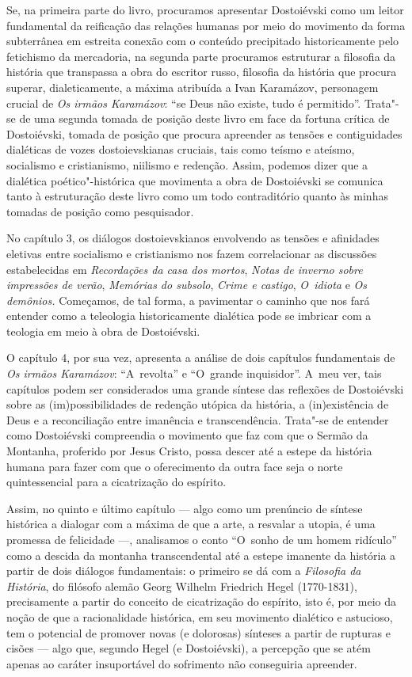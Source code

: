 Se, na primeira parte do livro, procuramos apresentar Dostoiévski como um
leitor fundamental da reificação das relações humanas por meio do
movimento da forma subterrânea em estreita conexão com o conteúdo
precipitado historicamente pelo fetichismo da mercadoria, na segunda
parte procuramos estruturar a filosofia da história que transpassa a
obra do escritor russo, filosofia da história que procura superar,
dialeticamente, a máxima atribuída a Ivan Karamázov, personagem crucial
de \emph{Os irmãos Karamázov}: ``se Deus não existe, tudo é permitido''.
Trata"-se de uma segunda tomada de posição deste livro em face da fortuna
crítica de Dostoiévski, tomada de posição que procura apreender as
tensões e contiguidades dialéticas de vozes dostoievskianas cruciais,
tais como teísmo e ateísmo, socialismo e cristianismo, niilismo e
redenção. Assim, podemos dizer que a dialética poético"-histórica que
movimenta a obra de Dostoiévski se comunica tanto à estruturação deste
livro como um todo contraditório quanto às minhas tomadas de posição
como pesquisador.

No capítulo 3, os diálogos dostoievskianos envolvendo as tensões e
afinidades eletivas entre socialismo e cristianismo nos fazem
correlacionar as discussões estabelecidas em \emph{Recordações da casa
dos mortos}, \emph{Notas de inverno sobre impressões de verão},
\emph{Memórias do subsolo}, \emph{Crime e castigo}, \emph{O~idiota} e
\emph{Os demônios.} Começamos, de tal forma, a pavimentar o caminho que
nos fará entender como a teleologia historicamente dialética pode se
imbricar com a teologia em meio à obra de Dostoiévski.

O capítulo 4, por sua vez, apresenta a análise de dois capítulos
fundamentais de \emph{Os irmãos Karamázov}: ``A~revolta'' e ``O~grande
inquisidor''. A~meu ver, tais capítulos podem ser considerados uma
grande síntese das reflexões de Dostoiévski sobre as (im)possibilidades
de redenção utópica da história, a (in)existência de Deus e a
reconciliação entre imanência e transcendência. Trata"-se de entender
como Dostoiévski compreendia o movimento que faz com que o Sermão da
Montanha, proferido por Jesus Cristo, possa descer até a estepe da
história humana para fazer com que o oferecimento da outra face seja o
norte quintessencial para a cicatrização do espírito.

Assim, no quinto e último capítulo --- algo como um prenúncio de síntese
histórica a dialogar com a máxima de que a arte, a resvalar a utopia, é
uma promessa de felicidade ---, analisamos o conto ``O~sonho de um homem
ridículo'' como a descida da montanha transcendental até a estepe
imanente da história a partir de dois diálogos fundamentais: o primeiro
se dá com a \emph{Filosofia da História}, do filósofo alemão Georg
Wilhelm Friedrich Hegel (1770-1831), precisamente a partir do conceito
de cicatrização do espírito, isto é, por meio da noção de que a
racionalidade histórica, em seu movimento dialético e astucioso, tem o
potencial de promover novas (e dolorosas) sínteses a partir de rupturas
e cisões --- algo que, segundo Hegel (e Dostoiévski), a percepção que se
atém apenas ao caráter insuportável do sofrimento não conseguiria
apreender.

